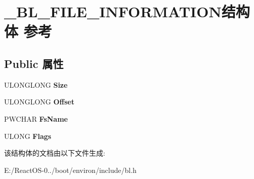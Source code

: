 \hypertarget{struct___b_l___f_i_l_e___i_n_f_o_r_m_a_t_i_o_n}{}\section{\+\_\+\+B\+L\+\_\+\+F\+I\+L\+E\+\_\+\+I\+N\+F\+O\+R\+M\+A\+T\+I\+O\+N结构体 参考}
\label{struct___b_l___f_i_l_e___i_n_f_o_r_m_a_t_i_o_n}
\subsection*{Public 属性}
\begin{DoxyCompactItemize}
\item 
\mbox{\label{struct___b_l___f_i_l_e___i_n_f_o_r_m_a_t_i_o_n_a1cd9fda2d807951081d98ae435756bde}} 
U\+L\+O\+N\+G\+L\+O\+NG {\bfseries Size}
\item 
\mbox{\label{struct___b_l___f_i_l_e___i_n_f_o_r_m_a_t_i_o_n_af051bf2b3a32aabeefad06ccc4097a91}} 
U\+L\+O\+N\+G\+L\+O\+NG {\bfseries Offset}
\item 
\mbox{\label{struct___b_l___f_i_l_e___i_n_f_o_r_m_a_t_i_o_n_ac54428eb2224d4c701248976b256873d}} 
P\+W\+C\+H\+AR {\bfseries Fs\+Name}
\item 
\mbox{\label{struct___b_l___f_i_l_e___i_n_f_o_r_m_a_t_i_o_n_abae523b29a89fc879892d10db5ec5e59}} 
U\+L\+O\+NG {\bfseries Flags}
\end{DoxyCompactItemize}


该结构体的文档由以下文件生成\+:\begin{DoxyCompactItemize}
\item 
E\+:/\+React\+O\+S-\/0../boot/environ/include/bl.\+h\end{DoxyCompactItemize}
